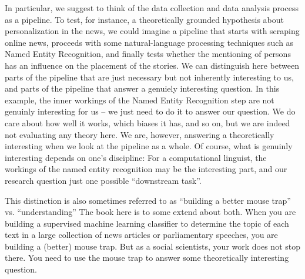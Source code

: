 In particular, we suggest to think of the data collection and data
analysis process as a pipeline. To test, for instance, a theoretically
grounded hypothesis about personalization in the news, we could
imagine a pipeline that starts with scraping online news, proceeds
with some natural-language processing techniques such as Named Entity
Recognition, and finally tests whether the mentioning of persons has
an influence on the placement of the stories. We can distinguish here
between parts of the pipeline that are just necessary but not
inherently interesting to us, and parts of the pipeline that answer a
genuiely interesting question. In this example, the inner workings of
the Named Entity Recognition step are not genuinly interesting for us
-- we just need to do it to answer our question. We do care about how
well it works, which biases it has, and so on, but we are indeed not
evaluating any theory here. We are, however, answering a theoretically
interesting when we look at the pipeline as a whole.  Of course, what
is genuinly interesting depends on one's discipline: For a
computational linguist, the workings of the named entity recognition
may be the interesting part, and our research question just one
possible ``downstream task''.

This distinction is also sometimes referred to as ``building a better
mouse trap'' vs. ``understanding''   The book here is to some extend about both. When you
are building a supervised machine learning classifier to determine the
topic of each text in a large collection of news articles or
parliamentary speeches, you are building a (better) mouse trap. But as
a social scientists, your work does not stop there. You need to use
the mouse trap to answer some theoretically interesting question.



